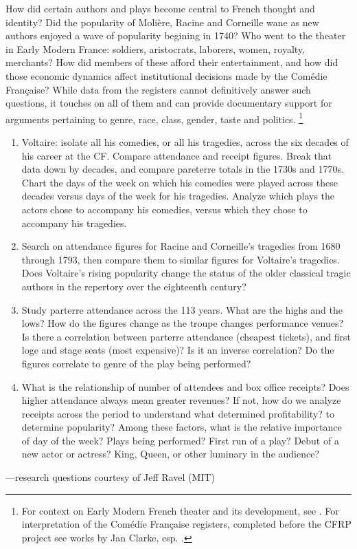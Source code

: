 \documentclass[	DIV=calc,%
							paper=a4,%
							fontsize=11pt,%
							twocolumn]{scrartcl}	 					%
\begin{document}
How did certain authors and plays become central to French thought and identity?  Did the popularity of Molière, Racine and Corneille wane as new authors enjoyed a wave of popularity begining in 1740?  Who went to the theater in Early Modern France: soldiers, aristocrats, laborers, women, royalty, merchants?  How did members of these afford their entertainment, and how did those economic dynamics affect institutional decisions made by the Comédie Française?  While data from the registers cannot definitively answer such questions, it touches on all of them and can provide documentary support for arguments pertaining to genre, race, class, gender, taste and politics.%
\footnote{For context on Early Modern French theater and its development, see \cite{HOWARTH:1997}. For interpretation of the Comédie Française registers, completed before the CFRP project see works by Jan Clarke, esp. \cite{CLARKE:2001}.}

\begin{framefloat}
  \fontsize{9pt}{9pt}\selectfont
	\begin{enumerate}[align=left]
	  \item Voltaire: isolate all his comedies, or all his tragedies, across the six decades of his career at the CF. Compare attendance and receipt figures. Break that data down by decades, and compare pareterre totals in the 1730s and 1770s. Chart the days of the week on which his comedies were played across these decades versus days of the week for his tragedies. Analyze which plays the actors chose to accompany his comedies, versus which they chose to accompany his tragedies.

		\item Search on attendance figures for Racine and Corneille's tragedies from 1680 through 1793, then compare them to similar figures for Voltaire's tragedies. Does Voltaire's rising popularity change the status of the older classical tragic authors in the repertory over the eighteenth century?

	  \item Study parterre attendance across the 113 years. What are the highs and the lows? How do the figures change as the troupe changes performance venues? Is there a correlation between parterre attendance (cheapest tickets), and first loge and stage seats (most expensive)? Is it an inverse correlation? Do the figures correlate to genre of the play being performed?

	  \item What is the relationship of number of attendees and box office receipts? Does higher attendance always mean greater revenues? If not, how do we analyze receipts across the period to understand what determined profitability? to determine popularity? Among these factors, what is the relative importance of day of the week? Plays being performed? First run of a play? Debut of a new actor or actress? King, Queen, or other luminary in the audience?
  \end{enumerate}
  \hfill —research questions courtesy of Jeff Ravel (MIT)
\end{framefloat}
\end{document}
